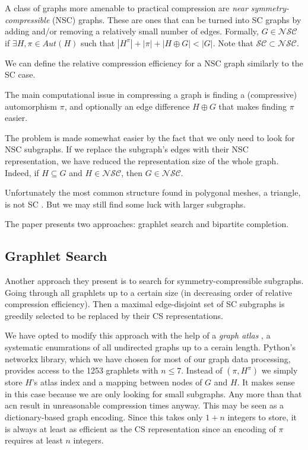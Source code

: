\documentclass{egpubl}
\begin{document}
A class of graphs more amenable to practical compression are \textit{near symmetry-compressible} (NSC) graphs. These are ones that can be turned into SC graphs by adding and/or removing a relatively small number of edges.
Formally, $G \in \mathcal{N}\mathcal{S}\mathcal{C}$ if $\exists H, \pi \in Aut(H)$ such that $|H^\pi| + |\pi| + |H \oplus G| < |G|$. Note that $\mathcal{S}\mathcal{C} \subset \mathcal{N}\mathcal{S}\mathcal{C}$.

We can define the relative compression efficiency for a NSC graph similarly to the SC case.

The main computational issue in compressing a graph is finding a (compressive) automorphism $\pi$,
and optionally an edge difference $H \oplus G$ that makes finding $\pi$ easier.

The problem is made somewhat easier by the fact that we only need to look for NSC subgraphs. If we replace the subgraph's edges with their NSC representation, we have reduced the representation size of the whole graph. Indeed, if $H \subseteq G$ and $H \in \mathcal{N}\mathcal{S}\mathcal{C}$, then $G \in \mathcal{N}\mathcal{S}\mathcal{C}$.

Unfortunately the most common structure found in polygonal meshes, a triangle, is not SC \cite[Theorem 3]{cibej2021automorphisms}. But we may still find some luck with larger subgraphs.

The paper presents two approaches: graphlet search and bipartite completion.

\subsection{Graphlet Search}
Another approach they present is to search for symmetry-compressible subgraphs. Going through all graphlets up to a certain size (in decreasing order of relative compression efficiency). Then a maximal edge-disjoint set of SC subgraphs is greedily selected to be replaced by their CS representations.

We have opted to modify this approach with the help of a \textit{graph atlas} \cite{read1998atlas}, a systematic enumrations of all undirected graphs up to a cerain length. Python's networkx library, which we have chosen for most of our graph data processing, provides access to the 1253 graphlets with $n \leq 7$.
Instead of $(\pi, H^\pi)$ we simply store $H$'s atlas index and a mapping between nodes of $G$ and $H$.
It makes sense in this case because we are only looking for small subgraphs.
Any more than that acn result in unreasonable compression times anyway.
This may be seen as a dictionary-based graph encoding. Since this takes only $1 + n$ integers to store, it is always at least as efficient as the CS representation since an encoding of $\pi$ requires at least $n$ integers.
\end{document}
